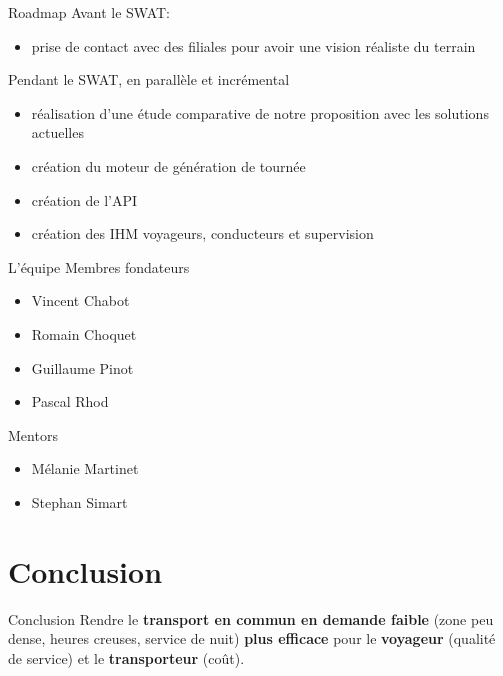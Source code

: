 \documentclass[table]{beamer}
\begin{document}
\begin{frame}{Roadmap}
  Avant le SWAT:
  \begin{itemize}
  \item prise de contact avec des filiales pour avoir une vision
    réaliste du terrain
  \end{itemize}

  Pendant le SWAT, en parallèle et incrémental
  \begin{itemize}
  \item réalisation d'une étude comparative de notre proposition avec
    les solutions actuelles
  \item création du moteur de génération de tournée
  \item création de l'API
  \item création des IHM voyageurs, conducteurs et supervision
  \end{itemize}
\end{frame}

\begin{frame}{L'équipe}
  Membres fondateurs
  \begin{itemize}
  \item Vincent Chabot
  \item Romain Choquet
  \item Guillaume Pinot
  \item Pascal Rhod
  \end{itemize}

  Mentors
  \begin{itemize}
  \item Mélanie Martinet
  \item Stephan Simart
  \end{itemize}
\end{frame}


\section{Conclusion}

\begin{frame}{Conclusion}
  Rendre le \textbf{transport en commun en demande faible} (zone peu
  dense, heures creuses, service de nuit) \textbf{plus efficace} pour
  le \textbf{voyageur} (qualité de service) et le
  \textbf{transporteur} (coût).
\end{frame}

\begin{frame}
  \titlepage
\end{frame}
\end{document}
